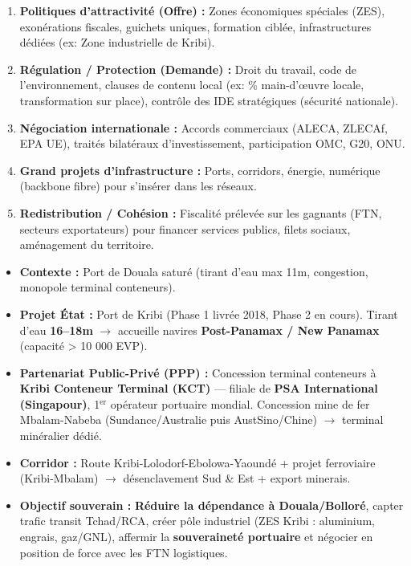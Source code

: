 \documentclass[11pt]{article}
\begin{document}
\begin{methode}
\begin{enumerate}
    \item \textbf{Politiques d'attractivité (Offre) :} Zones économiques spéciales (ZES), exonérations fiscales, guichets uniques, formation ciblée, infrastructures dédiées (ex: Zone industrielle de Kribi).
    \item \textbf{Régulation / Protection (Demande) :} Droit du travail, code de l'environnement, clauses de contenu local (ex: \% main-d'œuvre locale, transformation sur place), contrôle des IDE stratégiques (sécurité nationale).
    \item \textbf{Négociation internationale :} Accords commerciaux (ALECA, ZLECAf, EPA UE), traités bilatéraux d'investissement, participation OMC, G20, ONU.
    \item \textbf{Grand projets d'infrastructure :} Ports, corridors, énergie, numérique (backbone fibre) pour s'insérer dans les réseaux.
    \item \textbf{Redistribution / Cohésion :} Fiscalité prélevée sur les gagnants (FTN, secteurs exportateurs) pour financer services publics, filets sociaux, aménagement du territoire.
\end{enumerate}
\end{methode}

\begin{exemplebox}
\begin{itemize}
    \item \textbf{Contexte :} Port de Douala saturé (tirant d'eau max 11m, congestion, monopole terminal conteneurs).
    \item \textbf{Projet État :} Port de Kribi (Phase 1 livrée 2018, Phase 2 en cours). Tirant d'eau \textbf{16--18m} $\to$ accueille navires \textbf{Post-Panamax / New Panamax} (capacité > 10 000 EVP).
    \item \textbf{Partenariat Public-Privé (PPP) :} Concession terminal conteneurs à \textbf{Kribi Conteneur Terminal (KCT)} — filiale de \textbf{PSA International (Singapour)}, 1$^{\text{er}}$ opérateur portuaire mondial. Concession mine de fer Mbalam-Nabeba (Sundance/Australie puis AustSino/Chine) $\to$ terminal minéralier dédié.
    \item \textbf{Corridor :} Route Kribi-Lolodorf-Ebolowa-Yaoundé + projet ferroviaire (Kribi-Mbalam) $\to$ désenclavement Sud \& Est + export minerais.
    \item \textbf{Objectif souverain :} \textbf{Réduire la dépendance à Douala/Bolloré}, capter trafic transit Tchad/RCA, créer pôle industriel (ZES Kribi : aluminium, engrais, gaz/GNL), affermir la \textbf{souveraineté portuaire} et négocier en position de force avec les FTN logistiques.
\end{itemize}
\end{exemplebox}
\end{document}
